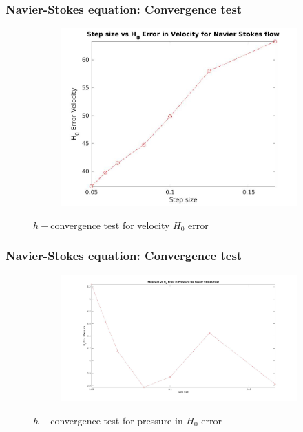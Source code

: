 \documentclass{beamer}
\begin{document}
\begin{frame}
\frametitle{Navier-Stokes equation: Convergence test}
\begin{figure}
\begin{subfigure}{0.8\textwidth}	
  \includegraphics[width=0.8\linewidth]{H0_convergence_velocity_n_s.jpg}
  \label{fig:vel_navier_stoke_conv_h0}
\end{subfigure}
\caption{$h-$convergence test for velocity $H_0$ error}
\label{navier_stoke_conv_h0}
\end{figure}
\end{frame}
\begin{frame}
\frametitle{Navier-Stokes equation: Convergence test}
\begin{figure}
\begin{subfigure}{\textwidth}	
  \includegraphics[width=\linewidth]{H0_convergence_pressure_n_s.jpg}
  \label{fig:pre_navier_stoke_conv_h0}
\end{subfigure}
\caption{$h-$convergence test for pressure in $H_0$ error}
\label{navier_stoke_conv_h0}
\end{figure}
\end{frame}
\end{document}
